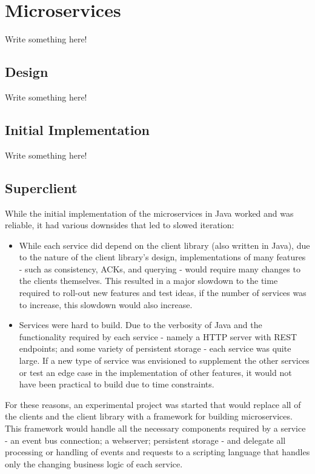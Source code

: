\documentclass{l3proj}
\begin{document}
\section{Microservices}
\label{sec:microservices}
Write something here!



\subsection{Design}
Write something here!

\subsection{Initial Implementation}
Write something here!

\subsection{Superclient}
While the initial implementation of the microservices in Java worked and was reliable, it had various downsides that led to slowed iteration:

\begin{itemize}
    \item While each service did depend on the client library (also written in Java), due to the nature of the client library's design, implementations of many features - such as consistency, ACKs, and querying - would require many changes to the clients themselves. This resulted in a major slowdown to the time required to roll-out new features and test ideas, if the number of services was to increase, this slowdown would also increase.
    \item Services were hard to build. Due to the verbosity of Java and the functionality required by each service - namely a HTTP server with REST endpoints; and some variety of persistent storage - each service was quite large. If a new type of service was envisioned to supplement the other services or test an edge case in the implementation of other features, it would not have been practical to build due to time constraints.
\end{itemize}

For these reasons, an experimental project was started that would replace all of the clients and the client library with a framework for building microservices. This framework would handle all the necessary components required by a service - an event bus connection; a webserver; persistent storage - and delegate all processing or handling of events and requests to a scripting language that handles only the changing business logic of each service.
\end{document}

